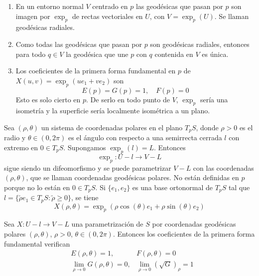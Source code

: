 \begin{properties}
    \hfill
    \begin{enumerate}
        \item En un entorno normal $V$ centrado en $p$ las geodésicas que pasan por $p$ son imagen por $\exp_p$ de rectas vectoriales en $U$, con $V = \exp_p(U)$. Se llaman geodésicas radiales.
        \item Como todas las geodésicas que pasan por $p$ son geodésicas radiales, entonces para todo $q \in V$ la geodésica que une $p$ con $q$ contenida en $V$ es única.
        \item Los coeficientes de la primera forma fundamental en $p$ de $X(u, v) = \exp_p(ue_1 + ve_2)$ son $$E(p) = G(p) = 1, \quad F(p) = 0$$
              Esto es solo cierto en $p$. De serlo en todo punto de $V$, $\exp_p$ sería una isometría y la superficie sería localmente isométrica a un plano.
    \end{enumerate}
\end{properties}

\begin{definition}
    Sea $(\rho, \theta)$ un sistema de coordenadas polares en el plano $T_pS$, donde $\rho>0$ es el radio y $\theta \in (0, 2\pi)$ es el ángulo con respecto a una semirrecta cerrada $l$ con extremo en $0 \in T_pS$.
    Supongamos $\exp_p(l) = L$. Entonces $$\exp_p : U-l \to V-L$$ sigue siendo un difeomorfismo y se puede parametrizar $V-L$ con las coordenadas $(\rho, \theta)$, que se llaman coordenadas geodésicas polares.
    No están definidas en $p$ porque no lo están en $0 \in T_pS$.
    Si $\{e_1, e_2\}$ es una base ortonormal de $T_pS$ tal que $l = \{ \tilde{\rho}e_1 \in T_pS : \tilde{\rho} \geq 0 \}$, se tiene $$X(\rho, \theta) = \exp_p(\rho \cos(\theta)e_1 + \rho \sin(\theta)e_2)$$
\end{definition}

\begin{proposition}
    Sea $X: U-l \to V-L$ una parametrización de $S$ por coordenadas geodésicas polares $(\rho, \theta)$, $\rho>0$, $\theta \in (0, 2\pi)$.
    Entonces los coeficientes de la primera forma fundamental verifican
    \begin{align*}
         & E(\rho, \theta) = 1,                          & F(\rho, \theta) = 0                          \\
         & \lim\limits_{\rho \to 0} G(\rho, \theta) = 0, & \lim\limits_{\rho \to 0} (\sqrt{G})_\rho = 1
    \end{align*}
\end{proposition}

